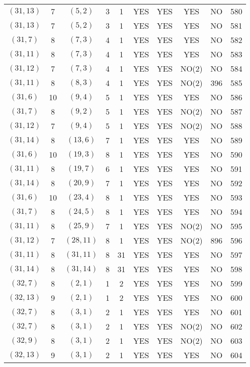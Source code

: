 \begin{longtable}{|c|c|c|c|c|c|c|c|c|c|}
$(31, 13)$ & 7 & $(5, 2)$ & 3 & 1 & YES & YES & YES & NO & 580\\
$(31, 13)$ & 7 & $(5, 2)$ & 3 & 1 & YES & YES & YES & NO & 581\\
$(31, 7)$ & 8 & $(7, 3)$ & 4 & 1 & YES & YES & YES & NO & 582\\
$(31, 11)$ & 8 & $(7, 3)$ & 4 & 1 & YES & YES & YES & NO & 583\\
$(31, 12)$ & 7 & $(7, 3)$ & 4 & 1 & YES & YES & NO(2) & NO & 584\\
$(31, 11)$ & 8 & $(8, 3)$ & 4 & 1 & YES & YES & NO(2) & 396 & 585\\
$(31, 6)$ & 10 & $(9, 4)$ & 5 & 1 & YES & YES & YES & NO & 586\\
$(31, 7)$ & 8 & $(9, 2)$ & 5 & 1 & YES & YES & NO(2) & NO & 587\\
$(31, 12)$ & 7 & $(9, 4)$ & 5 & 1 & YES & YES & NO(2) & NO & 588\\
$(31, 14)$ & 8 & $(13, 6)$ & 7 & 1 & YES & YES & YES & NO & 589\\
$(31, 6)$ & 10 & $(19, 3)$ & 8 & 1 & YES & YES & YES & NO & 590\\
$(31, 11)$ & 8 & $(19, 7)$ & 6 & 1 & YES & YES & YES & NO & 591\\
$(31, 14)$ & 8 & $(20, 9)$ & 7 & 1 & YES & YES & YES & NO & 592\\
$(31, 6)$ & 10 & $(23, 4)$ & 8 & 1 & YES & YES & YES & NO & 593\\
$(31, 7)$ & 8 & $(24, 5)$ & 8 & 1 & YES & YES & YES & NO & 594\\
$(31, 11)$ & 8 & $(25, 9)$ & 7 & 1 & YES & YES & NO(2) & NO & 595\\
$(31, 12)$ & 7 & $(28, 11)$ & 8 & 1 & YES & YES & NO(2) & 896 & 596\\
$(31, 11)$ & 8 & $(31, 11)$ & 8 & 31 & YES & YES & YES & NO & 597\\
$(31, 14)$ & 8 & $(31, 14)$ & 8 & 31 & YES & YES & YES & NO & 598\\
$(32, 7)$ & 8 & $(2, 1)$ & 1 & 2 & YES & YES & YES & NO & 599\\
$(32, 13)$ & 9 & $(2, 1)$ & 1 & 2 & YES & YES & YES & NO & 600\\
$(32, 7)$ & 8 & $(3, 1)$ & 2 & 1 & YES & YES & YES & NO & 601\\
$(32, 7)$ & 8 & $(3, 1)$ & 2 & 1 & YES & YES & NO(2) & NO & 602\\
$(32, 9)$ & 8 & $(3, 1)$ & 2 & 1 & YES & YES & NO(2) & NO & 603\\
$(32, 13)$ & 9 & $(3, 1)$ & 2 & 1 & YES & YES & YES & NO & 604\\

\end{longtable}
